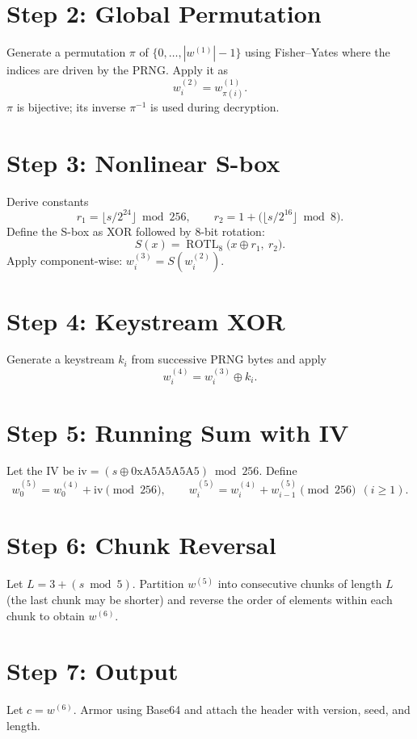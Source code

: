 \documentclass[11pt]{article}
\begin{document}
\section*{Step 2: Global Permutation}
Generate a permutation \(\pi\) of \(\{0,\dots,|w^{(1)}|-1\}\) using Fisher--Yates where the indices are driven by the PRNG. Apply it as
\[
 w^{(2)}_i = w^{(1)}_{\pi(i)}.
\]
\(\pi\) is bijective; its inverse \(\pi^{-1}\) is used during decryption.

\section*{Step 3: Nonlinear S-box}
Derive constants
\[
 r_1 = \big\lfloor s/2^{24} \big\rfloor \bmod 256, \qquad r_2 = 1 + \big( \big\lfloor s/2^{16} \big\rfloor \bmod 8 \big).
\]
Define the S-box as XOR followed by 8-bit rotation:
\[
 S(x) = \operatorname{ROTL}_8\big(x \oplus r_1,\ r_2\big).
\]
Apply component-wise: \(w^{(3)}_i = S(w^{(2)}_i)\).

\section*{Step 4: Keystream XOR}
Generate a keystream \(k_i\) from successive PRNG bytes and apply
\[
 w^{(4)}_i = w^{(3)}_i \oplus k_i.
\]

\section*{Step 5: Running Sum with IV}
Let the IV be \(\text{iv} = (s \oplus \text{0xA5A5A5A5}) \bmod 256\). Define
\[
 w^{(5)}_0 = w^{(4)}_0 + \text{iv} \pmod{256}, \qquad w^{(5)}_i = w^{(4)}_i + w^{(5)}_{i-1} \pmod{256}\ \ (i\ge 1).
\]

\section*{Step 6: Chunk Reversal}
Let \(L = 3 + (s \bmod 5)\). Partition \(w^{(5)}\) into consecutive chunks of length \(L\) (the last chunk may be shorter) and reverse the order of elements within each chunk to obtain \(w^{(6)}\).

\section*{Step 7: Output}
Let \(c = w^{(6)}\). Armor using Base64 and attach the header with version, seed, and length.
\end{document}
